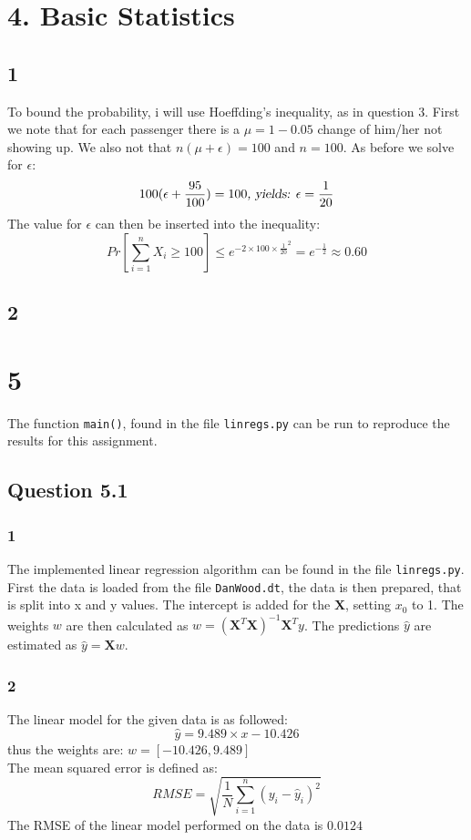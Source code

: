 \documentclass{article}
\begin{document}
\section{4. Basic Statistics}
\subsection{1}
To bound the probability, i will use Hoeffding's inequality, as in question 3. First we note that for each passenger there is a $\mu = 1-0.05$ change of him/her not showing up. We also not that $n(\mu + \epsilon) = 100$ and $n=100$. As before we solve for $\epsilon$:
$$ 
100(\epsilon + \frac{95}{100}) = 100 \textsl{, yields: } \epsilon = \dfrac{1}{20}
$$
The value for $\epsilon$ can then be inserted into the inequality:
\begin{equation*}
Pr \left[ \sum\limits^{n}_{i=1}X_i \geq 100 \right] \leq e^{-2 \times 100 \times \frac{1}{20}^2} = e^{-\frac{1}{2}}  \approx 0.60
\end{equation*}
\subsection{2}
\section{5}
The function \texttt{main()}, found in the file \texttt{linregs.py} can be run to reproduce the results for this assignment.
\subsection{Question 5.1}
\subsubsection{1}
The implemented linear regression algorithm can be found in the file \texttt{linregs.py}. \\
First the data is loaded from the file \texttt{DanWood.dt}, the data is then prepared, that is split into x and y values. The intercept is added for the $\mathbf{X}$, setting $x_0$ to 1. The weights $w$ are then calculated as  $w = (\mathbf{X}^T \mathbf{X})^{-1}\mathbf{X}^T y$. The predictions $\hat{y}$ are estimated as $ \hat{y} = \mathbf{X}w$.
\subsubsection{2}
The linear model for the given data is as followed: 
$$ \hat{y} = 9.489 \times x - 10.426 $$
thus the weights are: $w=[-10.426,9.489]$ \\ The mean squared error is defined as:
\begin{equation*}
RMSE = \sqrt{ \dfrac{1}{N} \sum\limits^{n}_{i=1} (y_i - \hat{y}_i )^2}
\end{equation*}
The RMSE of the linear model performed on the data is $0.0124$
\end{document}
